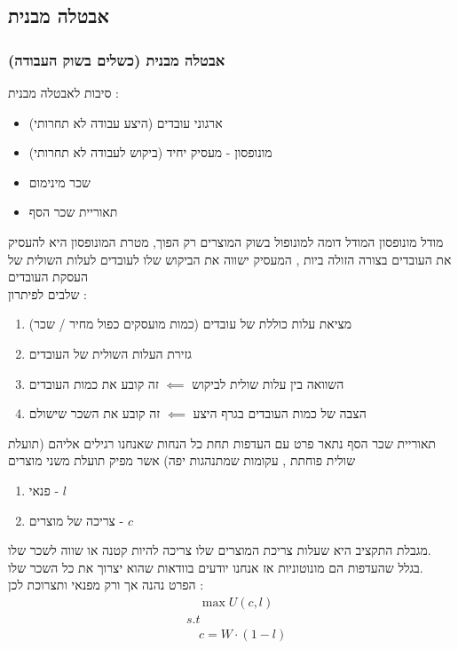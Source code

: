 \documentclass{beamer}
\begin{document}
\begin{RTL}
\section{אבטלה מבנית}
\begin{frame}[allowframebreaks]
    \frametitle{אבטלה מבנית (כשלים בשוק העבודה)}
    סיבות לאבטלה מבנית : 
    \begin{itemize}
        \item ארגוני עובדים (היצע עבודה לא תחרותי)
        \item מונופסון - מעסיק יחיד (ביקוש לעבודה לא תחרותי)
        \item שכר מינימום
        \item תאוריית שכר הסף
    \end{itemize}

    \framebreak
    \begin{block}{מודל מונופסון}
        המודל דומה למונופול בשוק המוצרים רק הפוך, מטרת המונופסון היא להעסיק את העובדים בצורה הזולה ביות , המעסיק ישווה את הביקוש שלו לעובדים לעלות השולית של העסקת העובדים \\
        שלבים לפיתרון :
        \begin{enumerate}
            \item מציאת עלות כוללת של עובדים (כמות מועסקים כפול מחיר / שכר)
            \item גזירת העלות השולית של העובדים
            \item השוואה בין עלות שולית לביקוש $\impliedby$ זה קובע את כמות העובדים
            \item הצבה של כמות העובדים בגרף היצע $\impliedby$ זה קובע את השכר שישולם
        \end{enumerate}
    \end{block}

    \framebreak

    \begin{block}{תאוריית שכר הסף}
        נתאר פרט עם העדפות תחת כל הנחות שאנחנו רגילים אליהם (תועלת שולית פוחתת , עקומות שמתנהגות יפה) אשר מפיק תועלת משני מוצרים
        \begin{enumerate}
            \item פנאי - $l$
            \item צריכה של מוצרים - $c$
        \end{enumerate}
        מגבלת התקציב היא שעלות צריכת המוצרים שלו צריכה להיות קטנה או שווה לשכר שלו. \\
        בגלל שהעדפות הם מונוטוניות אז אנחנו יודעים בוודאות שהוא יצרוך את כל השכר שלו. \\
        הפרט נהנה אך ורק מפנאי ותצרוכת לכן :
        \begin{align*}
        &\quad \max U(c,l) \\
        & s.t \\
        &\quad c = W \cdot (1 - l)
      \end{align*}
    \end{block}


\end{frame}
\end{RTL}
\end{document}

